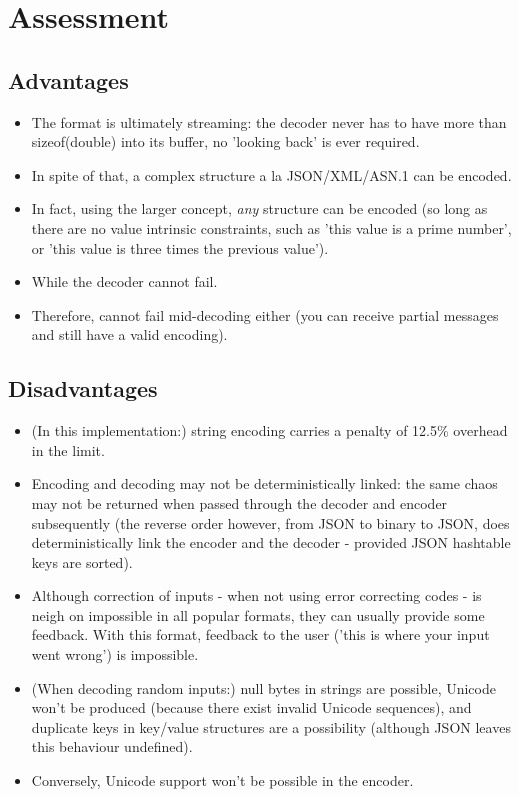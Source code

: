 \section{Assessment}

\subsection{Advantages}

\begin{itemize}
\item The format is ultimately streaming: the decoder never has to have
      more than sizeof(double) into its buffer, no 'looking back' is
      ever required.
\item In spite of that, a complex structure a la JSON/XML/ASN.1 can be
      encoded.
\item In fact, using the larger concept, \textit{any} structure can
      be encoded (so long as there are no value intrinsic constraints, such
      as 'this value is a prime number', or 'this value is three times the
      previous value').
\item While the decoder cannot fail.
\item Therefore, cannot fail mid-decoding either (you can receive
      partial messages and still have a valid encoding).
\end{itemize}

\subsection{Disadvantages}

\begin{itemize}
\item (In this implementation:)
      string encoding carries a penalty of 12.5\% overhead in the limit.
\item Encoding and decoding may not be deterministically linked: the same
      chaos may not be returned when passed through the decoder and encoder
      subsequently (the reverse order however, from JSON to binary to JSON,
      does deterministically link the encoder and the decoder - provided
      JSON hashtable keys are sorted).
\item Although correction of inputs - when not using error correcting codes -
      is neigh on impossible in all popular formats, they can usually
      provide some feedback. With this format, feedback to the user
      ('this is where your input went wrong') is impossible.
\item (When decoding random inputs:) null bytes in strings are possible,
      Unicode won't be produced
      (because there exist invalid Unicode sequences), and duplicate
      keys in key/value structures are a possibility (although JSON
      leaves this behaviour undefined).
\item Conversely, Unicode support won't be possible in the encoder.
\end{itemize}
